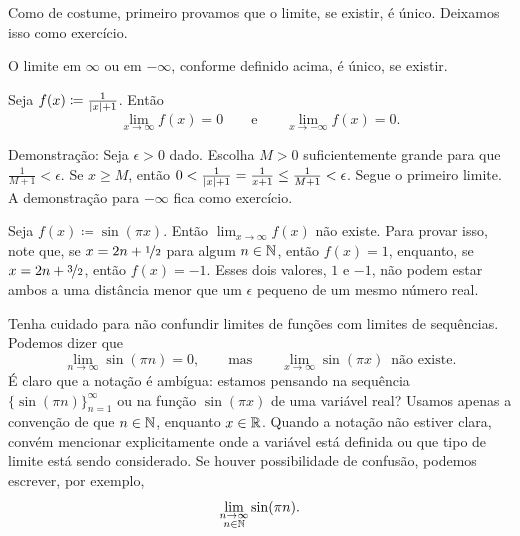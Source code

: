 Como de costume, primeiro provamos que o limite, se existir,
é único.
Deixamos isso como exercício.

\begin{prop} \label{liminfty:unique}
O limite em $\infty$ ou em $-\infty$, conforme definido acima, é único, se existir.
\end{prop}

\begin{example}
Seja $f(x) \coloneqq \frac{1}{\lvert {x} \rvert+1}$. Então
\begin{equation*}
\lim_{x\to \infty} f(x) = 0 \qquad \text{e} \qquad
\lim_{x\to -\infty} f(x) = 0 .
\end{equation*}

Demonstração:
Seja $\epsilon > 0$ dado. Escolha $M > 0$ suficientemente grande
para que $\frac{1}{M+1} < \epsilon$. Se
$x \geq M$, então $0 < \frac{1}{\lvert {x} \rvert+1} = \frac{1}{x+1} \leq \frac{1}{M+1} < \epsilon$.
Segue o primeiro limite.
A demonstração para $-\infty$ fica como exercício.
\end{example}

\begin{example}
Seja $f(x) \coloneqq \sin(\pi x)$. Então $\lim_{x\to\infty} f(x)$ não existe.
Para provar isso, note que, se $x = 2n+\nicefrac{1}{2}$ para algum $n \in
{\mathbb{N}}$, então $f(x)=1$,
enquanto, se $x = 2n+\nicefrac{3}{2}$, então $f(x)=-1$.
Esses dois valores, $1$ e $-1$, não podem estar ambos
a uma distância menor que um $\epsilon$ pequeno de um mesmo número real.

Tenha cuidado para não confundir limites de funções com limites de sequências.
Podemos dizer que
\begin{equation*}
\lim_{n \to \infty} \sin(\pi n) = 0, \qquad \text{mas} \qquad
\lim_{x \to \infty} \sin(\pi x) \enspace \text{não existe}.
\end{equation*}
É claro que a notação é ambígua: estamos pensando na
sequência $\bigl\{ \sin (\pi n) \bigr\}_{n=1}^\infty$ ou na função $\sin(\pi x)$
de uma variável real? Usamos apenas a convenção
de que $n \in {\mathbb{N}}$, enquanto $x \in {\mathbb{R}}$. Quando a notação não estiver clara,
convém mencionar explicitamente onde a variável está definida ou que tipo
de limite está sendo considerado. Se houver possibilidade de confusão, podemos
escrever, por exemplo,
\begin{equation*}
\lim_{\substack{n \to \infty\\n \in {\mathbb{N}}}} \sin(\pi n) .
\end{equation*}
\end{example}

